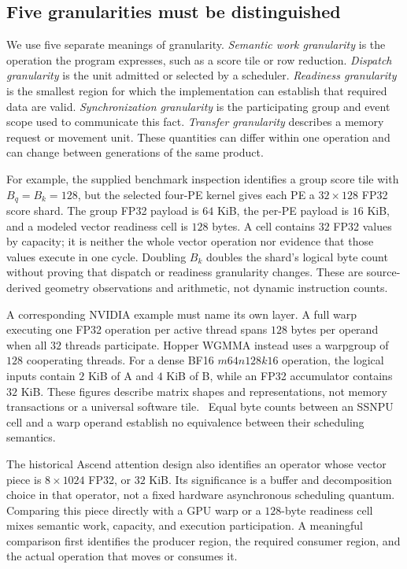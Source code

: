 \subsection{Five granularities must be distinguished}

We use five separate meanings of granularity. \emph{Semantic work granularity} is the operation the program expresses, such as a score tile or row reduction. \emph{Dispatch granularity} is the unit admitted or selected by a scheduler. \emph{Readiness granularity} is the smallest region for which the implementation can establish that required data are valid. \emph{Synchronization granularity} is the participating group and event scope used to communicate this fact. \emph{Transfer granularity} describes a memory request or movement unit. These quantities can differ within one operation and can change between generations of the same product.

For example, the supplied benchmark inspection identifies a group score tile with $B_q=B_k=128$, but the selected four-PE kernel gives each PE a $32\times128$ FP32 score shard. The group FP32 payload is $64$ KiB, the per-PE payload is $16$ KiB, and a modeled vector readiness cell is $128$ bytes. A cell contains $32$ FP32 values by capacity; it is neither the whole vector operation nor evidence that those values execute in one cycle. Doubling $B_k$ doubles the shard's logical byte count without proving that dispatch or readiness granularity changes. These are source-derived geometry observations and arithmetic, not dynamic instruction counts.~\citep{u002-benchmark-fa,u001-ssnpu-audit}

A corresponding NVIDIA example must name its own layer. A full warp executing one FP32 operation per active thread spans $128$ bytes per operand when all $32$ threads participate. Hopper WGMMA instead uses a warpgroup of $128$ cooperating threads. For a dense BF16 $m64n128k16$ operation, the logical inputs contain $2$ KiB of A and $4$ KiB of B, while an FP32 accumulator contains $32$ KiB. These figures describe matrix shapes and representations, not memory transactions or a universal software tile.~\citep{u001-ptx} Equal byte counts between an SSNPU cell and a warp operand establish no equivalence between their scheduling semantics.

The historical Ascend attention design also identifies an operator whose vector piece is $8\times1024$ FP32, or $32$ KiB. Its significance is a buffer and decomposition choice in that operator, not a fixed hardware asynchronous scheduling quantum.~\citep{u001-ascend-fa-design} Comparing this piece directly with a GPU warp or a $128$-byte readiness cell mixes semantic work, capacity, and execution participation. A meaningful comparison first identifies the producer region, the required consumer region, and the actual operation that moves or consumes it.

